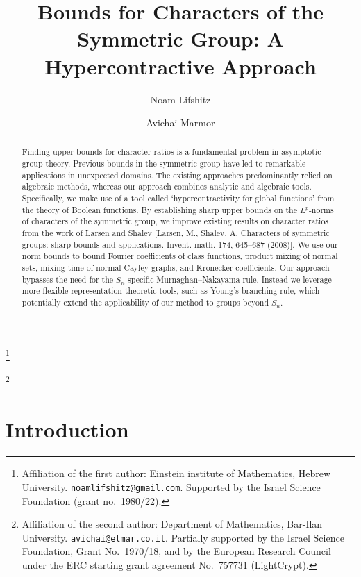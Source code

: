 \documentclass[11pt, letterpaper]{amsart}
\date{}
\begin{document}
\title[Hypercontractivity and Character Bounds]{Bounds for Characters of the Symmetric Group: A Hypercontractive Approach}

\author{Noam Lifshitz}
\thanks{Affiliation of the first author: Einstein institute of Mathematics, Hebrew University. \texttt{noamlifshitz@gmail.com}. Supported by the Israel Science Foundation (grant no.~1980/22).}
\author{Avichai Marmor}
\thanks{Affiliation of the second author: Department of Mathematics, Bar-Ilan University. \texttt{avichai@elmar.co.il}. Partially supported by the Israel Science Foundation, Grant No.\ 1970/18, and by the European Research Council under the ERC starting grant agreement No.\ 757731 (LightCrypt).}


\maketitle
\begin{abstract}
   Finding upper bounds for character ratios is a fundamental problem in asymptotic group theory. Previous bounds in the symmetric group have led to remarkable applications in unexpected domains.
    The existing approaches predominantly relied on algebraic methods, whereas our approach combines analytic and algebraic tools. Specifically, we make use of a tool called `hypercontractivity for global functions' from the theory of Boolean functions. By establishing sharp upper bounds on the $L^p$-norms of characters of the symmetric group, we improve existing results on character ratios from the work of Larsen and Shalev [Larsen, M., Shalev, A. Characters of symmetric groups: sharp bounds and applications. Invent. math. 174, 645–687 (2008)]. 
   We use our norm bounds to bound Fourier coefficients of class functions, product mixing of normal sets, mixing time of normal Cayley graphs, and Kronecker coefficients. Our approach bypasses the need for the $S_n$-specific Murnaghan--Nakayama rule. Instead we leverage more flexible representation theoretic tools, such as Young's branching rule, which potentially extend the applicability of our method to groups beyond $S_n$.
\end{abstract}

\section{Introduction}
\end{document}
